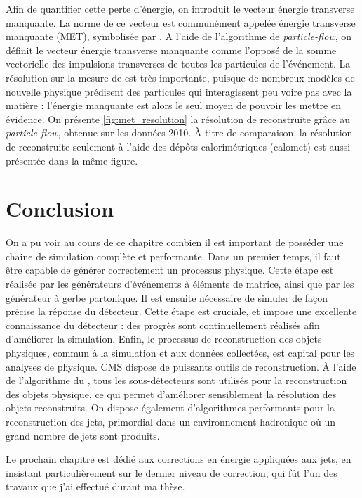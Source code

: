 Afin de quantifier cette perte d'énergie, on introduit le vecteur énergie transverse manquante. La norme de ce vecteur est communément appelée énergie transverse manquante (MET), symbolisée par \met. A l'aide de l'algorithme de \emph{particle-flow}, on définit le vecteur énergie transverse manquante comme l'opposé de la somme vectorielle des impulsions transverses de toutes les particules de l'événement. La résolution sur la mesure de \met est très importante, puisque de nombreux modèles de nouvelle physique prédisent des particules qui interagissent peu voire pas avec la matière : l'énergie manquante est alors le seul moyen de pouvoir les mettre en évidence. On présente \cref{fig:met_resolution} la résolution de \met reconstruite grâce au \emph{particle-flow}, obtenue sur les données 2010. À titre de comparaison, la résolution de \met reconstruite seulement à l'aide des dépôts calorimétriques (calomet) est aussi présentée dans la même figure.

\section{Conclusion}

On a pu voir au cours de ce chapitre combien il est important de posséder une chaine de simulation complète et performante. Dans un premier temps, il faut être capable de générer correctement un processus physique. Cette étape est réalisée par les générateurs d'événements à éléments de matrice, ainsi que par les générateur à gerbe partonique. Il est ensuite nécessaire de simuler de façon précise la réponse du détecteur. Cette étape est cruciale, et impose une excellente connaissance du détecteur : des progrès sont continuellement réalisés afin d'améliorer la simulation. Enfin, le processus de reconstruction des objets physiques, commun à la simulation et aux données collectées, est capital pour les analyses de physique. CMS dispose de puissants outils de reconstruction. À l'aide de l'algorithme du \pf, tous les sous-détecteurs sont utilisés pour la reconstruction des objets physique, ce qui permet d'améliorer sensiblement la résolution des objets reconstruits. On dispose également d'algorithmes performants pour la reconstruction des jets, primordial dans un environnement hadronique où un grand nombre de jets sont produits.

\medskip

Le prochain chapitre est dédié aux corrections en énergie appliquées aux jets, en insistant particulièrement sur le dernier niveau de correction, qui fût l'un des travaux que j'ai effectué durant ma thèse.